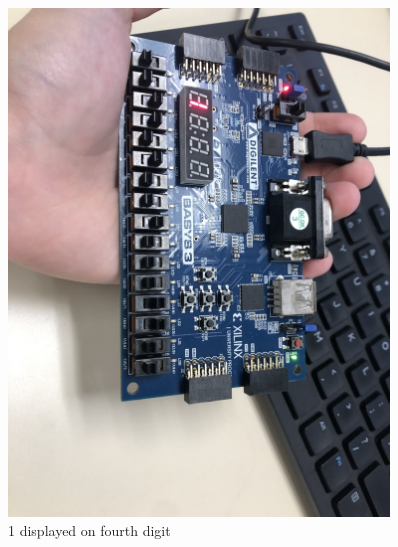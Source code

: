 \documentclass[11pt]{article}
\begin{document}
\begin{figure}[ht]\centering 
	\includegraphics[width= 0.9\textwidth]{b8.png}
	\caption{1 displayed on fourth digit}
	\label{fig: pic7}
\end{figure}
\end{document}

